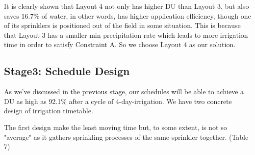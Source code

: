 \documentclass[12pt,a4paper,titlepage]{article}
\begin{document}
It is clearly shown that Layout 4 not only has higher DU than
Layout 3, but also saves 16.7\% of water, in other words, has
higher application efficiency, though one of its sprinklers is
positioned out of the field in some situation. This is because
that Layout 3 has a smaller min precipitation rate which leads to
more irrigation time in order to satisfy Constraint A. So we
choose Layout 4 as our solution.


\subsection{Stage3: Schedule Design}


 As we've discussed in the previous stage, our schedules will be able to achieve a DU as high as 92.1\% after a cycle of 4-day-irrigation. We have two concrete design of irrigation timetable.

The first design make the least moving time but, to some extent,
is not so "average" as it gathers sprinkling processes of the same
sprinkler together. (Table 7)
\end{document}
